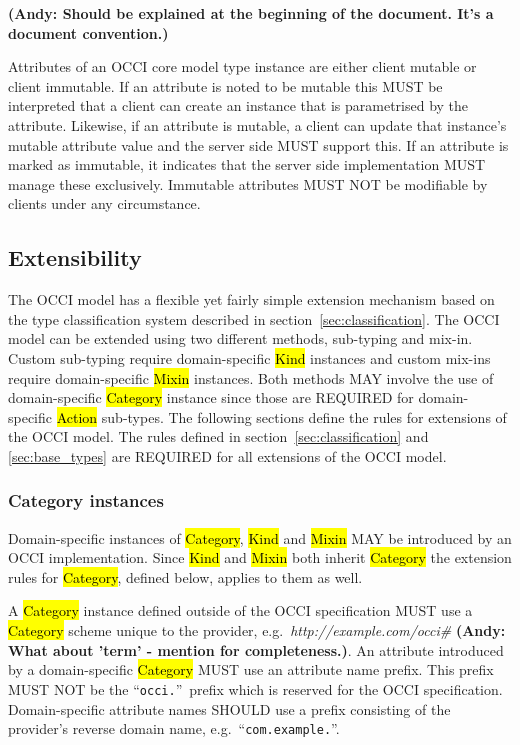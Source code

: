 \documentclass[10pt,a4paper]{article}
\begin{document}
\textbf{(Andy: Should be explained at the beginning of the document. It's a document convention.)}

Attributes of an OCCI core model type instance are
either client mutable or client immutable. If an attribute is noted to
be mutable this MUST be interpreted that a client can create an
instance that is parametrised by the attribute. Likewise, if
an attribute is mutable, a client can update that instance's
mutable attribute value and the server side MUST support this. If an
attribute is marked as immutable, it indicates that the server side
implementation MUST manage these exclusively. Immutable attributes
MUST NOT be modifiable by clients under any circumstance.

\subsection{Extensibility}
\label{sec:extensibility}
The OCCI model has a flexible yet fairly simple extension mechanism based on
the type classification system described in section~\ref{sec:classification}.
%
The OCCI model can be extended using two different methods, sub-typing and
mix-in. Custom sub-typing require domain-specific \hl{Kind} instances and
custom mix-ins require domain-specific \hl{Mixin} instances.  Both methods MAY
involve the use of domain-specific \hl{Category} instance since those are
REQUIRED for domain-specific \hl{Action} sub-types.  The following sections
define the rules for extensions of the OCCI model.
%
The rules defined in section~\ref{sec:classification} and \ref{sec:base_types}
are REQUIRED for all extensions of the OCCI model.

\subsubsection{Category instances}
\label{sec:ext:category}
Domain-specific instances of \hl{Category}, \hl{Kind} and \hl{Mixin} MAY be
introduced by an OCCI implementation. Since \hl{Kind} and \hl{Mixin} both
inherit \hl{Category} the extension rules for \hl{Category}, defined below,
applies to them as well.

A \hl{Category} instance defined outside of the OCCI specification MUST use a
\hl{Category} scheme unique to the provider,
e.g.~\textit{http://example.com/occi\#} \textbf{(Andy: What about 'term' - mention for completeness.)}.
%
An attribute introduced by a domain-specific \hl{Category} MUST
use an attribute name prefix. This prefix MUST NOT be the ``\texttt{occi.}''~prefix
which is reserved for the OCCI specification. Domain-specific attribute names
SHOULD use a prefix consisting of the provider's reverse domain name,
e.g.~``\texttt{com.example.}''.
\end{document}
